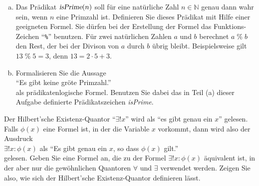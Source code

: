 \exercise
\begin{enumerate}[(a)]
\item Das Pr\"adikat $\textsl{isPrime}(n)$ soll f\"ur eine nat\"urliche Zahl $n \in \mathbb{N}$ genau dann
      wahr sein, wenn $n$ eine Primzahl ist.  Definieren Sie dieses Pr\"adikat mit Hilfe einer
      geeigneten Formel.  Sie d\"urfen bei der Erstellung der Formel das Funktions-Zeichen 
      ``\texttt{\%}'' 
      benutzen.  F\"ur zwei nat\"urlichen Zahlen $a$ und $b$ berechnet $a \;\texttt{\%}\; b$ den Rest, der bei der
      Divison von $a$ durch $b$ \"ubrig bleibt.  Beispielsweise gilt $13 \;\texttt{\%}\; 5 = 3$, denn
      $13 = 2 \cdot 5 + 3$.
\item Formalisieren Sie die Aussage 
      \\[0.2cm]
      \hspace*{1.3cm}
      ``Es gibt keine gr\"o\3te Primzahl.'' 
      \\[0.2cm]
      als pr\"adikatenlogische Formel.  Benutzen Sie dabei das in Teil (a) dieser Aufgabe definierte
      Pr\"adikatszeichen \textsl{isPrime}.  \eox
\end{enumerate}

\exercise
Der Hilbert'sche Existenz-Quantor ``$\exists!x$'' wird als ``es gibt genau ein $x$'' gelesen.
Falls $\phi(x)$ eine Formel ist, in der die Variable $x$ vorkommt, dann wird also der Ausdruck
\\[0.2cm]
\hspace*{1.3cm}
$\exists! x\!:\!\phi(x)$ \quad als \quad ``Es gibt genau ein $x$, so dass $\phi(x)$ gilt.''
\\[0.2cm]
gelesen.
Geben Sie eine Formel an, die zu der Formel $\exists! x\!:\!\phi(x)$ \"aquivalent ist, in der aber nur die
gew\"ohnlichen Quantoren $\forall$ und $\exists$ verwendet werden.  Zeigen Sie also, wie sich der
Hilbert'sche Existenz-Quantor definieren l\"asst.
\eox

